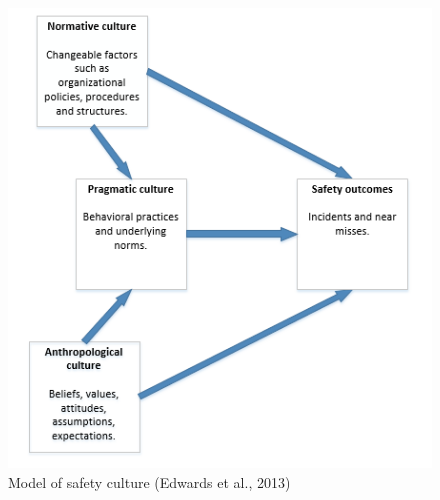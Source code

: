 \documentclass[
  12pt,
]{scrbook}
\begin{document}
\begin{figure}
\hypertarget{fig:figure91}{%
\centering
\includegraphics{./media/10-understanding-and-improving-safety-culture/media/image1.png}
\caption{Model of safety culture (Edwards et al., 2013)}\label{fig:figure91}
}
\end{figure}
\end{document}
